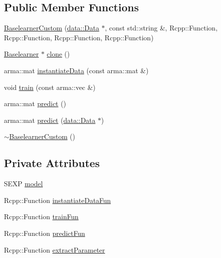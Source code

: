 \subsection*{Public Member Functions}
\begin{DoxyCompactItemize}
\item 
\mbox{\hyperlink{classblearner_1_1_baselearner_custom_ac812a6b0d79f75560caa91ec101ca6e3}{Baselearner\+Custom}} (\mbox{\hyperlink{classdata_1_1_data}{data\+::\+Data}} $\ast$, const std\+::string \&, Rcpp\+::\+Function, Rcpp\+::\+Function, Rcpp\+::\+Function, Rcpp\+::\+Function)
\item 
\mbox{\hyperlink{classblearner_1_1_baselearner}{Baselearner}} $\ast$ \mbox{\hyperlink{classblearner_1_1_baselearner_custom_a1442790658c7ad08832a94fbc60ff94a}{clone}} ()
\item 
arma\+::mat \mbox{\hyperlink{classblearner_1_1_baselearner_custom_a83c25e681bb606ae4a36c249a36229b9}{instantiate\+Data}} (const arma\+::mat \&)
\item 
void \mbox{\hyperlink{classblearner_1_1_baselearner_custom_a31e3921f86f267d36135d07bf1d16551}{train}} (const arma\+::vec \&)
\item 
arma\+::mat \mbox{\hyperlink{classblearner_1_1_baselearner_custom_a7d9640dbb9a118b77735cf79a5850652}{predict}} ()
\item 
arma\+::mat \mbox{\hyperlink{classblearner_1_1_baselearner_custom_aeeb3a3934b94f095bfe689cff385dfa7}{predict}} (\mbox{\hyperlink{classdata_1_1_data}{data\+::\+Data}} $\ast$)
\item 
\mbox{\hyperlink{classblearner_1_1_baselearner_custom_a5238f894da2b3e746b3a9e647b4ba6e2}{$\sim$\+Baselearner\+Custom}} ()
\end{DoxyCompactItemize}
\subsection*{Private Attributes}
\begin{DoxyCompactItemize}
\item 
S\+E\+XP \mbox{\hyperlink{classblearner_1_1_baselearner_custom_a99cf99e3a150fdbf77d7e738682df1cf}{model}}
\item 
Rcpp\+::\+Function \mbox{\hyperlink{classblearner_1_1_baselearner_custom_a6372076461467dc41f7af4ee198a91c6}{instantiate\+Data\+Fun}}
\item 
Rcpp\+::\+Function \mbox{\hyperlink{classblearner_1_1_baselearner_custom_a7755acb5207be9e839cc9bfd75df649b}{train\+Fun}}
\item 
Rcpp\+::\+Function \mbox{\hyperlink{classblearner_1_1_baselearner_custom_ac08fe685a93483f036b3019b6ed011cb}{predict\+Fun}}
\item 
Rcpp\+::\+Function \mbox{\hyperlink{classblearner_1_1_baselearner_custom_a4b88f7464f9c686a35d40f438119ea40}{extract\+Parameter}}
\end{DoxyCompactItemize}
